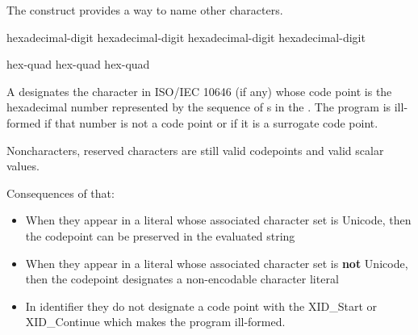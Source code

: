 \documentclass{wg21}
\begin{document}
\pnum
The  construct provides a way to name
other characters.

\begin{bnf}
    \br
    hexadecimal-digit hexadecimal-digit hexadecimal-digit hexadecimal-digit
\end{bnf}

\begin{bnf}
    \br
     hex-quad\br
     hex-quad hex-quad
\end{bnf}

A 
designates the character in ISO/IEC 10646 (if any)
whose code point is the hexadecimal number represented by
the sequence of s
in the .
The program is ill-formed if that number is not a code point
or if it is a surrogate code point.

\begin{quoteblock}
Noncharacters, reserved characters
are still valid codepoints and valid scalar values.

Consequences of that:
\begin{itemize}
\item When they appear in a literal whose associated character set is Unicode, then the codepoint can be preserved in the evaluated string
\item When they appear in a literal whose associated character set is \textbf{not} Unicode, then the codepoint designates a non-encodable character literal
\item In identifier they do not designate a code point with the XID_Start or XID_Continue which makes the program ill-formed.
\end{itemize}

\end{quoteblock}
\end{document}
